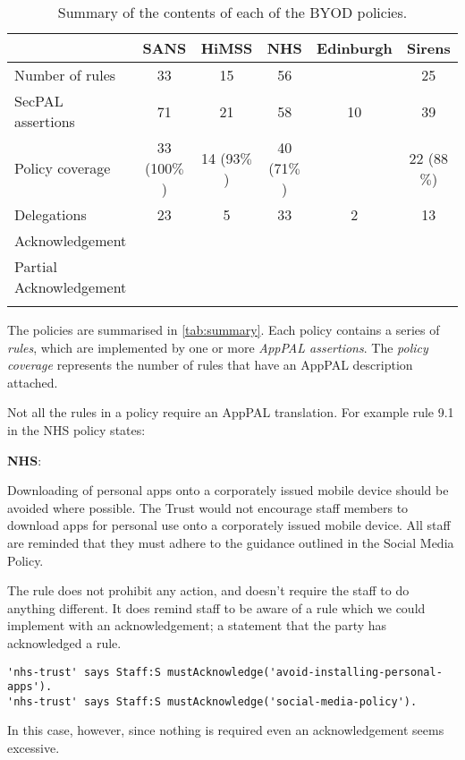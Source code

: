\documentclass{easychair}
\newenvironment{policyrule}[1]{%
  \begin{mdframed}\footnotesize
      \noindent\textbf{\sffamily #1}:~\itshape%
}{%
  \end{mdframed}
}
\begin{document}
\begin{table}\centering\footnotesize\sffamily
  \begin{tabular}{l c c c c c}
    \toprule
                             & {SANS}       & {HiMSS}     & {NHS}       & {Edinburgh} & {Sirens}    \\
    \midrule
    Number of rules          & 33           & 15          & 56          &             & 25          \\
    SecPAL assertions        & 71           & 21          & 58          & 10          & 39          \\
    Policy coverage          & 33 (100$\%$) & 14 (93$\%$) & 40 (71$\%$) &             & 22 (88$\%$) \\
    \midrule
    Delegations              & 23           & 5           & 33          & 2           & 13          \\
    Acknowledgement          &              &             &             &             &             \\
    Partial Acknowledgement  &              &             &             &             &             \\
    \bottomrule             \\
  \end{tabular}
  \label{tab:summary}
  \caption{Summary of the contents of each of the BYOD policies.}
\end{table}

The policies are summarised in \autoref{tab:summary}.
Each policy contains a series of \emph{rules}, which are implemented by one or more \emph{AppPAL assertions}.
The \emph{policy coverage} represents the number of rules that have an AppPAL description attached.

Not all the rules in a policy require an AppPAL translation.
For example rule 9.1 in the NHS policy states:
\begin{policyrule}{NHS}
  Downloading of personal apps onto a corporately issued mobile device should be avoided where possible.
  The Trust would not encourage staff members to download apps for personal use onto a corporately issued mobile device.
  All staff are reminded that they must adhere to the guidance outlined in the Social Media Policy.
\end{policyrule}
The rule does not prohibit any action, and doesn't require the staff to do anything different.
It does remind staff to be aware of a rule which we could implement with an acknowledgement; a statement that the party has acknowledged a rule.
\begin{lstlisting}
'nhs-trust' says Staff:S mustAcknowledge('avoid-installing-personal-apps').
'nhs-trust' says Staff:S mustAcknowledge('social-media-policy').
\end{lstlisting}
In this case, however, since nothing is required even an acknowledgement seems excessive.
\end{document}
